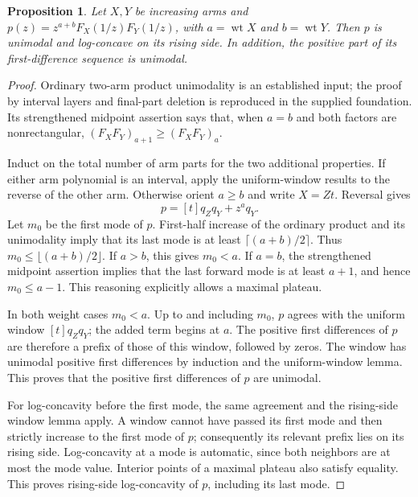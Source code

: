 \documentclass[11pt]{article}
\newtheorem{proposition}{Proposition}[section]
\begin{document}
\par\medskip

\begin{proposition}
Let $X,Y$ be increasing arms and
$p(z)=z^{a+b}F_X(1/z)F_Y(1/z)$, with $a=\operatorname{wt}X$
and $b=\operatorname{wt}Y$. Then $p$ is unimodal and log-concave
on its rising side. In addition, the positive part of its
first-difference sequence is unimodal.
\end{proposition}
\begin{proof}
Ordinary two-arm product unimodality is an established input;
the proof by interval layers and final-part deletion is reproduced
in the supplied foundation. Its strengthened midpoint assertion
says that, when $a=b$ and both factors are nonrectangular,
$(F_XF_Y)_{a+1}\ge(F_XF_Y)_a$.

Induct on the total number of arm parts for the two additional
properties. If either arm polynomial is an interval, apply the
uniform-window results to the reverse of the other arm. Otherwise
orient $a\ge b$ and write $X=Zt$. Reversal gives
\[
 p=[t]q_Zq_Y+z^a q_Y.
\]
Let $m_0$ be the first mode of $p$. First-half increase of the
ordinary product and its unimodality imply that its last mode
is at least $\lceil(a+b)/2\rceil$. Thus
$m_0\le\lfloor(a+b)/2\rfloor$. If $a>b$, this gives $m_0<a$.
If $a=b$, the strengthened midpoint assertion implies that the
last forward mode is at least $a+1$, and hence $m_0\le a-1$.
This reasoning explicitly allows a maximal plateau.

In both weight cases $m_0<a$. Up to and including
$m_0$, $p$ agrees with the uniform window $[t]q_Zq_Y$; the
added term begins at $a$. The positive first differences of
$p$ are therefore a prefix of those of this window, followed
by zeros. The window has unimodal positive first differences
by induction and the uniform-window lemma. This proves that
the positive first differences of $p$ are unimodal.

For log-concavity before the first mode, the same agreement
and the rising-side window lemma apply. A window cannot have
passed its first mode and then strictly increase to the first
mode of $p$; consequently its relevant prefix lies on its
rising side. Log-concavity at a mode is automatic, since both
neighbors are at most the mode value. Interior points of a
maximal plateau also satisfy equality. This proves rising-side
log-concavity of $p$, including its last mode.
\end{proof}
\end{document}
